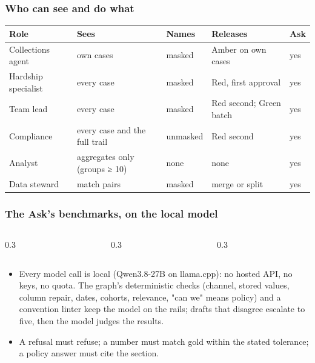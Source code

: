 \documentclass[aspectratio=169,10pt]{beamer}
\begin{document}
\appendix
\begin{frame}
  \frametitle{Who can see and do what}
  \scriptsize
  \begin{tabular}{@{}lllll@{}}
    \toprule
    \textbf{Role} & \textbf{Sees} & \textbf{Names} & \textbf{Releases} & \textbf{Ask} \\ \midrule
    Collections agent & own cases & masked & Amber on own cases & yes \\
    Hardship specialist & every case & masked & Red, first approval & yes \\
    Team lead & every case & masked & Red second; Green batch & yes \\
    Compliance & every case and the full trail & unmasked & Red second & yes \\
    Analyst & aggregates only (groups ≥ 10) & none & none & yes \\
    Data steward & match pairs & masked & merge or split & yes \\
    \bottomrule
  \end{tabular}
\end{frame}

\begin{frame}
  \frametitle{The Ask's benchmarks, on the local model}
  \begin{columns}[T]
    \begin{column}{0.3\textwidth}\end{column}
    \begin{column}{0.3\textwidth}\end{column}
    \begin{column}{0.3\textwidth}\end{column}
  \end{columns}
  \vspace{0.8em}
  \begin{itemize}\setlength\itemsep{0.3em}\scriptsize
    \item Every model call is local (Qwen3.8-27B on llama.cpp): no hosted API, no keys, no quota. The graph's deterministic checks
      (channel, stored values, column repair, dates, cohorts, relevance, "can we" means policy) and a convention linter
      keep the model on the rails; drafts that disagree escalate to five, then the model judges the results.
    \item A refusal must refuse; a number must match gold within the stated tolerance; a policy answer must cite the section.
  \end{itemize}
\end{frame}
\end{document}
